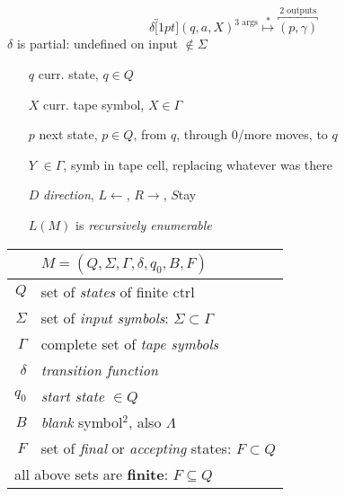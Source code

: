 {\footnotesize
\begin{minipage}[]{0.5\linewidth}
\setlength{\abovedisplayskip}{0pt}
\setlength{\belowdisplayskip}{0pt}
  \[\delta\overbracket[1pt]{(q,a,X)}^\text{3 args} \overset{*}{\mapsto} \overbracket{(p,\gamma)}^\text{2 outputs} \]
  $\delta$ is partial: undefined on input \(\notin \Sigma\)
\begin{enumerate}[leftmargin=*,labelindent=0pt]
    \item[$q$] curr. state, \(q \in Q\)
    \item[$X$] curr. tape symbol, \(X \in \Gamma\)
    \item[$p$] next state, \(p \in Q\), from \(q\), through 0/more moves, to \(q\)
    \item[$Y$] \(\in \Gamma\), symb in tape cell, replacing whatever was there
    \item[$D$] \emph{direction}, \(L\leftarrow\), \(R\rightarrow\), \(S\)tay
    \item[]\(L(M)\) is \emph{recursively enumerable}
    \end{enumerate}

\end{minipage}
\begin{minipage}{0.5\linewidth}
  \centering
  \begin{tabular}{r|p{3.8cm}}
    & $ M = (Q,\Sigma,\Gamma,\delta,q_{0},B,F)$  \\
    \hline
    $Q$ & set of \emph{states} of finite ctrl\\
    $\Sigma$ & set of \emph{input symbols}: \(\Sigma \subset \Gamma\)\\
    $\Gamma$ & complete set of \emph{tape symbols}\\
    $\delta$ & \emph{transition function}\\
    $q_{0}$  &  \emph{start state} \(\in Q\)\\
    $B$     & \emph{blank} symbol$^{2}$, also \(\Lambda\)\\
    $F$      & set of \emph{final} or \emph{accepting} states: \(F \subset Q\)\\
    \hline
    \multicolumn{2}{l}{all above sets are \textbf{finite}: \(F \subseteq Q\) }\\
    \hline
\end{tabular}\\
\end{minipage}
 }
